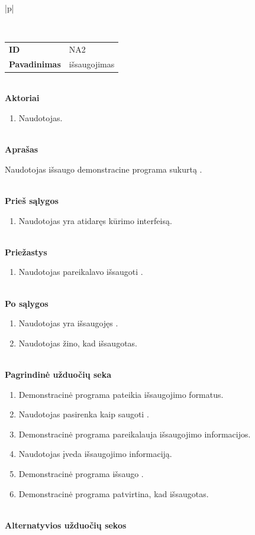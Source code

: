 \begin{center}
    \begin{longtable}{|p{\textwidth}|}
    \caption{\DVCM{} saugojimo naudojimo atvejis}
	\label{tab:program_re_dvcm_save}
	\\ \hline
    \begin{tabular}{@{}p{3.5cm}p{12cm}}
    	\\
    	\textbf{ID} & NA2
    	\\
    	\textbf{Pavadinimas} & \DVCM{} išsaugojimas
    	\\
    \end{tabular}
    \\
    \textbf{Aktoriai}
    \begin{enumerate}
    	\item Naudotojas.
	\end{enumerate}
    \\
    \textbf{Aprašas}

      Naudotojas išsaugo demonstracine programa sukurtą \DVCM{}.

    \\
    \textbf{Prieš sąlygos}
    \begin{enumerate}
    	\item Naudotojas yra atidaręs \DVCM{} kūrimo interfeisą.
	\end{enumerate}
    \\
    \textbf{Priežastys}
    \begin{enumerate}
    	\item Naudotojas pareikalavo išsaugoti \DVCM{}.
	\end{enumerate}
    \\
    \textbf{Po sąlygos}
    \begin{enumerate}
    	\item Naudotojas yra išsaugojęs \DVCM{}.
      \item Naudotojas žino, kad \DVCM{} išsaugotas.
	\end{enumerate}
    \\
    \textbf{Pagrindinė užduočių seka}
    \begin{enumerate}
    	\item Demonstracinė programa pateikia išsaugojimo formatus.
    	\item Naudotojas pasirenka kaip saugoti \DVCM{}.
			\item Demonstracinė programa pareikalauja išsaugojimo informacijos.
			\item Naudotojas įveda išsaugojimo informaciją.
      \item Demonstracinė programa išsaugo \DVCM{}.
      \item Demonstracinė programa patvirtina, kad \DVCM{} išsaugotas.
	\end{enumerate}
    \\
    \textbf{Alternatyvios užduočių sekos}


\end{longtable}
\end{center}
